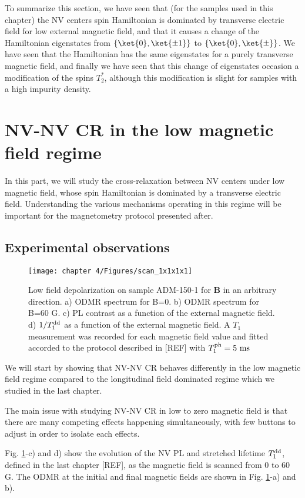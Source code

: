 \documentclass[a4paper,11pt]{report}
\begin{document}
\begin{refsection}
\medskip

To summarize this section, we have seen that (for the samples used in this chapter) the NV centers spin Hamiltonian is dominated by transverse electric field for low external magnetic field, and that it causes a change of the Hamiltonian eigenstates from $\{ \ket{0}, \ket{\pm 1} \}$ to $\{ \ket{0}, \ket{\pm} \}$. We have seen that the Hamiltonian has the same eigenstates for a purely transverse magnetic field, and finally we have seen that this change of eigenstates occasion a modification of the spins $T_2^*$, although this modification is slight for samples with a high impurity density.

\section{NV-NV CR in the low magnetic field regime}
In this part, we will study the cross-relaxation between NV centers under low magnetic field, whose spin Hamiltonian is dominated by a transverse electric field. Understanding the various mechanisms operating in this regime will be important for the magnetometry protocol presented after.

\subsection{Experimental observations}
\begin{figure}[h]
\centering
\texttt{[image: chapter 4/Figures/scan\_1x1x1x1]}
\caption{Low field depolarization on sample ADM-150-1 for $\mathbf{B}$ in an arbitrary direction. a) ODMR spectrum for B=0. b) ODMR spectrum for B=60 G. c) PL contrast as a function of the external magnetic field. d) $1/T_1^{\rm dd}$ as a function of the external magnetic field. A $T_1$ measurement was recorded for each magnetic field value and fitted accorded to the protocol described in [REF] with $T_1^{\rm ph}=5\ \rm ms$}
\label{scan 1x1x1x1}
\end{figure}
We will start by showing that NV-NV CR behaves differently in the low magnetic field regime compared to the longitudinal field dominated regime which we studied in the last chapter.

The main issue with studying NV-NV CR in low to zero magnetic field is that there are many competing effects happening simultaneously, with few buttons to adjust in order to isolate each effects.

Fig. \ref{scan 1x1x1x1}-c) and d) show the evolution of the NV PL and stretched lifetime $T_1^{\rm dd}$, defined in the last chapter [REF], as the magnetic field is scanned from 0 to 60 G. The ODMR at the initial and final magnetic fields are shown in Fig. \ref{scan 1x1x1x1}-a) and b).


\end{refsection}
\end{document}
